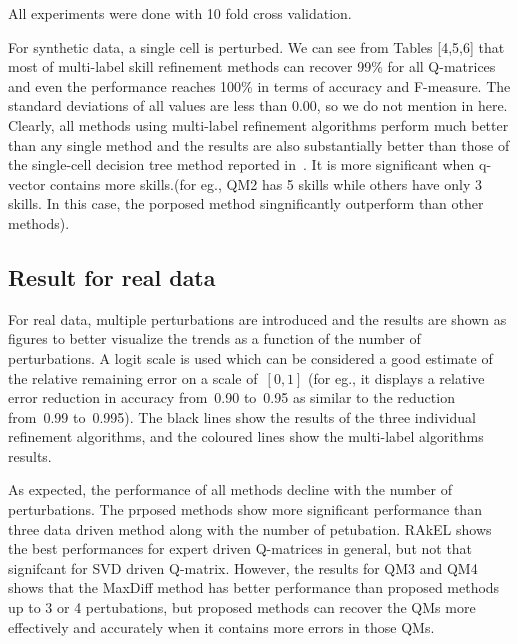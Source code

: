 \documentclass[11pt]{article}
\begin{document}
All experiments were done with 10 fold cross validation.

 
 For synthetic data, a single cell is perturbed. We can see from Tables [4,5,6]
that most of multi-label skill refinement methods can recover 99\% for all
Q-matrices and even the performance reaches 100\% in terms of accuracy
and F-measure. The standard deviations of all values are less than 0.00, so we do not mention in here. Clearly, all methods using multi-label refinement algorithms perform much better than any single method and the results are also substantially better than those of the single-cell decision tree method reported in~\cite{desmarais2015combining}. It is more significant when q-vector contains more skills.(for eg., QM2 has 5 skills while others have only 3 skills. In this case, the porposed method singnificantly outperform than other methods). 




\subsection{Result for real data}
For real data, multiple perturbations are introduced and the results are shown as figures to better visualize the trends as a function of the number of perturbations.   A logit scale is used which can be considered a good estimate of the relative remaining error on a scale of~$[0,1]$ (for eg., it displays a relative error reduction in accuracy from~0.90 to~0.95 as similar to the reduction from~0.99 to~0.995). The black lines show the results of the three individual refinement algorithms, and the coloured lines show the multi-label algorithms results.  

As expected, the performance of all methods decline with the number of perturbations. The prposed methods show more significant performance than three data driven method along with the number of petubation. RAkEL shows the best performances for expert driven Q-matrices in general, but not that signifcant for SVD driven Q-matrix. However, the results for QM3 and QM4 shows that the MaxDiff method has better performance than proposed methods up to 3 or 4 pertubations, but proposed methods can recover the QMs more effectively and accurately when it contains more errors in those QMs.
\end{document}
